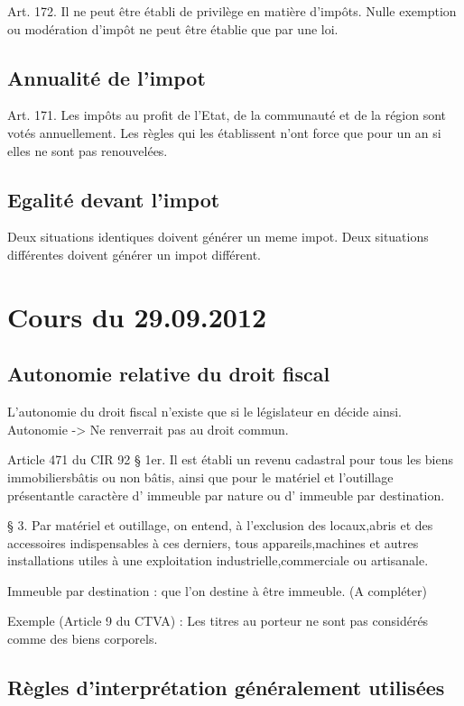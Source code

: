\documentclass{book}
\begin{document}
Art. 172. Il ne peut être établi de privilège en matière d'impôts. Nulle exemption ou modération d'impôt ne peut être établie que par une loi. 


\section{Annualité de l'impot}

  Art. 171. Les impôts au profit de l'Etat, de la communauté et de la région sont votés annuellement.
  Les règles qui les établissent n'ont force que pour un an si elles ne sont pas renouvelées.

\section{Egalité devant l'impot}

Deux situations identiques doivent générer un meme impot. Deux situations différentes doivent générer un impot différent.


\chapter{Cours du 29.09.2012}

\section{Autonomie relative du droit fiscal}

L'autonomie du droit fiscal n'existe que si le législateur en décide ainsi. Autonomie -> Ne renverrait pas au droit commun.

Article 471 du CIR 92
   § 1er. Il est établi un revenu cadastral pour tous les biens immobiliersbâtis ou non bâtis, ainsi que pour le matériel et l'outillage présentantle caractère d' immeuble par nature ou d' immeuble par destination.

   § 3. Par matériel et outillage, on entend, à l'exclusion des locaux,abris et des accessoires indispensables à ces derniers, tous appareils,machines et autres installations utiles à une exploitation industrielle,commerciale ou artisanale.

Immeuble par destination : que l'on destine à être immeuble. (A compléter)

Exemple (Article 9 du CTVA) : Les titres au porteur ne sont pas considérés comme des biens corporels.

\section{Règles d'interprétation généralement utilisées}
\end{document}
